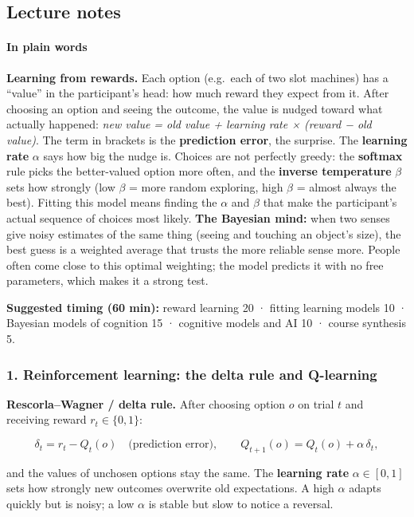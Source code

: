 
\subsection{Lecture notes}

\paragraph{In plain words}

\textbf{Learning from rewards.} Each option (e.g.~each of two slot
machines) has a ``value'' in the participant's head: how much reward
they expect from it. After choosing an option and seeing the outcome,
the value is nudged toward what actually happened: \emph{new value = old
value + learning rate × (reward − old value)}. The term in brackets is
the \textbf{prediction error}, the surprise. The \textbf{learning rate}
\(\alpha\) says how big the nudge is. Choices are not perfectly greedy:
the \textbf{softmax} rule picks the better-valued option more often, and
the \textbf{inverse temperature} \(\beta\) sets how strongly (low
\(\beta\) = more random exploring, high \(\beta\) = almost always the
best). Fitting this model means finding the \(\alpha\) and \(\beta\)
that make the participant's actual sequence of choices most likely.
\textbf{The Bayesian mind:} when two senses give noisy estimates of the
same thing (seeing and touching an object's size), the best guess is a
weighted average that trusts the more reliable sense more. People often
come close to this optimal weighting; the model predicts it with no free
parameters, which makes it a strong test.

\textbf{Suggested timing (60 min):} reward learning 20 · fitting
learning models 10 · Bayesian models of cognition 15 · cognitive models
and AI 10 · course synthesis 5.

\subsubsection{1. Reinforcement learning: the delta rule and Q-learning}

\textbf{Rescorla--Wagner / delta rule.} After choosing option \(o\) on
trial \(t\) and receiving reward \(r_t \in \{0, 1\}\):

\[
\delta_t = r_t - Q_t(o) \quad\text{(prediction error)}, \qquad
Q_{t+1}(o) = Q_t(o) + \alpha\,\delta_t,
\]

and the values of unchosen options stay the same. The \textbf{learning
rate} \(\alpha \in [0, 1]\) sets how strongly new outcomes overwrite old
expectations. A high \(\alpha\) adapts quickly but is noisy; a low
\(\alpha\) is stable but slow to notice a reversal.

